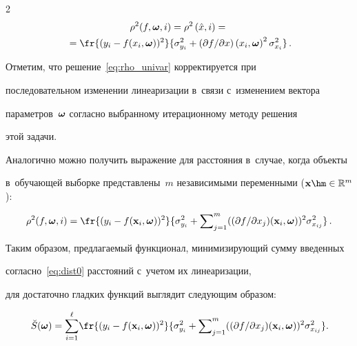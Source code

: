 \begin{multicols}{2}
\begin{multline}
  \rho^2(f, \bomega, i) = \rho^2\left(\hat{x}, i\right) = {}\\

  {}=\fr{(y_i - f(x_i, 

\bomega))^2}{\sigma^2_{y_i} + ({\partial f}/{\partial x})\left(x_i, \bomega\right)^2 

\sigma^2_{x_i}}\,.

  \label{eq:rho_univar}

\end{multline}



Отметим, что решение~\eqref{eq:rho_univar} корректируется при

последовательном изменении линеаризации в~связи с~изменением вектора

па\-ра\-мет\-ров~$\boldsymbol{\omega}$ согласно выбранному итерационному методу решения

этой задачи.



Аналогично можно получить выражение для расстояния в~случае, когда объекты 

в~обучающей выборке представлены~$m$ независимыми переменными ($\mathbf{x}

\hm \in \mathbb{R}^m$):



\noindent

$$

  \rho^2(f, \bomega, i) = \fr{(y_i - f(\mathbf{x}_i, 

\bomega))^2}{\sigma_{y_i}^2 + \sum\nolimits_{j = 1}^m (({\partial f}/{\partial 

x_j})(\mathbf{x}_i, \bomega))^2 \sigma^2_{x_{ij}}}\,.

$$



Таким образом, предлагаемый функционал, ми\-ни\-ми\-зи\-ру\-ющий сумму введенных

со\-глас\-но~\eqref{eq:dist0} рас\-сто\-яний с~учетом их линеаризации,

для достаточно глад\-ких функций выглядит следующим образом:

\begin{equation}

  \breve{S}(\bomega) = \sum\limits_{i = 1}^\ell\! \fr{(y_i - f(\mathbf{x}_i, 

\bomega))^2}{\sigma_{y_i}^2 + \sum\nolimits_{j = 1}^m (({\partial f}/{\partial 

x_j})(\mathbf{x}_i, \bomega))^2 \sigma^2_{x_{ij}}}.\!


\end{equation}
\end{multicols}
